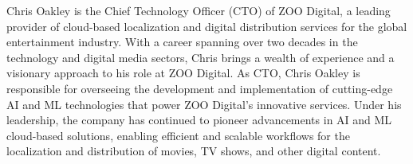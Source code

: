 Chris Oakley is the Chief Technology Officer (CTO) of ZOO Digital, a leading provider of cloud-based localization and digital distribution services for the global entertainment industry. With a career spanning over two decades in the technology and digital media sectors, Chris brings a wealth of experience and a visionary approach to his role at ZOO Digital.
As CTO, Chris Oakley is responsible for overseeing the development and implementation of cutting-edge AI and ML technologies that power ZOO Digital's innovative services. Under his leadership, the company has continued to pioneer advancements in AI and ML cloud-based solutions, enabling efficient and scalable workflows for the localization and distribution of movies, TV shows, and other digital content.
